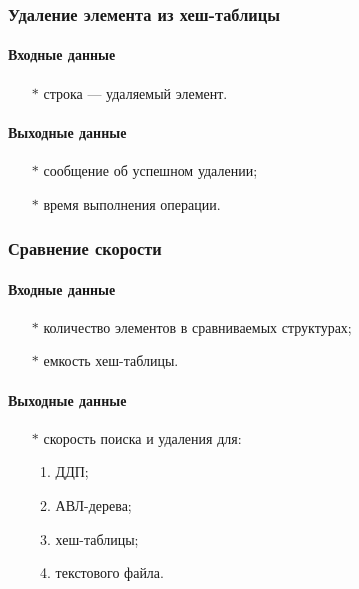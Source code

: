 \documentclass[a4paper,12pt]{extarticle}
\begin{document}
\subsubsection{Удаление элемента из хеш-таблицы}

\paragraph{Входные данные}
\begin{itemize}
    \item[$*$] строка --- удаляемый элемент.
\end{itemize}

\paragraph{Выходные данные}
\begin{itemize}
    \item[$*$] сообщение об успешном удалении;
    \item[$*$] время выполнения операции.
\end{itemize}

\subsubsection{Сравнение скорости}

\paragraph{Входные данные}
\begin{itemize}
    \item[$*$] количество элементов в сравниваемых структурах;
    \item[$*$] емкость хеш-таблицы.
\end{itemize}

\paragraph{Выходные данные}
\begin{itemize}
    \item[$*$] скорость поиска и удаления для:
    \begin{enumerate}
    	\item ДДП;
    	\item АВЛ-дерева;
    	\item хеш-таблицы;
    	\item текстового файла.
    \end{enumerate}
\end{itemize}
\end{document}
